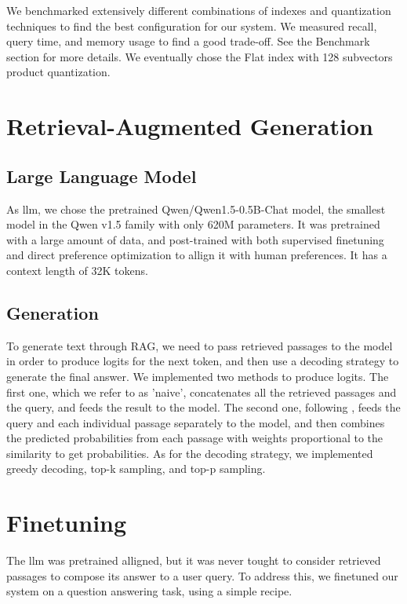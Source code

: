 \documentclass[11pt]{article}
\begin{document}
We benchmarked extensively different combinations of indexes and quantization techniques to find the best configuration
for our system. We measured recall, query time, and memory usage to find a good trade-off. See the Benchmark section for more details.
We eventually chose the Flat index with 128 subvectors product quantization.

\section{Retrieval-Augmented Generation}

\subsection{Large Language Model}

As llm, we chose the pretrained Qwen/Qwen1.5-0.5B-Chat \cite{qwen_hf} model, the smallest model in the Qwen v1.5 family
with only 620M parameters. It was pretrained with a large amount of data, and post-trained with both supervised finetuning 
and direct preference optimization to allign it with human preferences. It has a context length of 32K tokens.

\subsection{Generation}

To generate text through RAG, we need to pass retrieved passages to the model in order to produce logits
for the next token, and then use a decoding strategy to generate the final answer.
We implemented two methods to produce logits. The first one, which we refer to as 'naive', concatenates all the retrieved passages
and the query, and feeds the result to the model. The second one, following \cite{replug}, feeds the query and each individual passage
separately to the model, and then combines the predicted probabilities from each passage with weights proportional to the similarity
to get probabilities.
As for the decoding strategy, we implemented greedy decoding, top-k sampling, and top-p sampling. \cite{smth}

\section{Finetuning}

The llm was pretrained alligned, but it was never tought to consider retrieved passages to compose its answer to a user query.
To address this, we finetuned our system on a question answering task, using a simple recipe.
\end{document}
